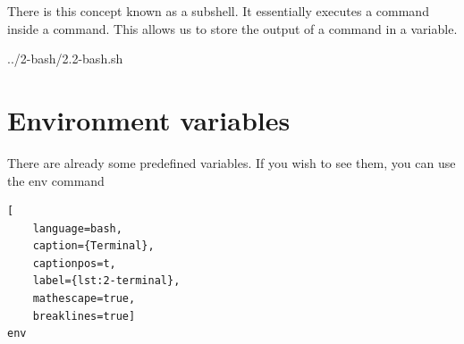 There is this concept known as a subshell. It essentially executes a command inside a command.
This allows us to store the output of a command in a variable.


{../2-bash/2.2-bash.sh}

\section{Environment variables}

There are already some predefined variables. If you wish to see them, you can use the env
command

\begin{lstlisting}[
    language=bash, 
    caption={Terminal},
    captionpos=t, 
    label={lst:2-terminal}, 
    mathescape=true,
    breaklines=true]
env
\end{lstlisting}


